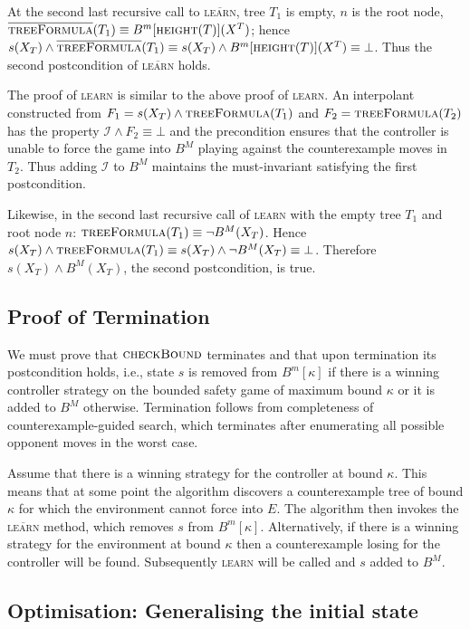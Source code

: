 \documentclass{llncs}
\newcommand{\II}{\mathcal{I}}
\newcommand{\textoverline}[1]{$\overline{\mbox{#1}}$}
\begin{document}
At the second last recursive call to \textsc{\textoverline{learn}}, tree $T_1$
is empty, $n$ is the root node, $\textsc{\textoverline{treeFormula}}(T_1)
\equiv B^m[\textsc{height}(T)](X^T)$; hence $s(X_T) \land
\textsc{\textoverline{treeFormula}}(T_1) \equiv s(X_T) \land
B^m[\textsc{height}(T)](X^T) \equiv \bot$.  Thus the second postcondition of
\textsc{\textoverline{learn}} holds.

The proof of \textsc{learn} is similar to the above proof of \textsc{learn}. An
interpolant constructed from $F_1=s(X_T) \land \textsc{treeFormula}(T_1)$
and $F_2 = \textsc{treeFormula}(T_2)$ has the property $\II \land F_2 \equiv
\bot$ and the precondition ensures that the controller is unable to force the
game into $B^M$ playing against the counterexample moves in $T_2$. Thus adding
$\II$ to $B^M$ maintains the must-invariant satisfying the first postcondition.

Likewise, in the second last recursive call of \textsc{learn} with the empty
tree $T_1$ and root node $n$: $\textsc{treeFormula}(T_1) \equiv \lnot
B^M(X_T)$.  Hence $s(X_T) \land \textsc{treeFormula}(T_1) \equiv
s(X_T) \land \lnot B^M(X_T) \equiv \bot$. Therefore $s(X_T) \land
B^M(X_T)$, the second postcondition, is true.

\subsection{Proof of Termination}

We must prove that $\textsc{checkBound}$ terminates and that upon termination
its postcondition holds, i.e., state $s$ is removed from $B^m[\kappa]$ if there
is a winning controller strategy on the bounded safety game of maximum bound
$\kappa$ or it is added to $B^M$ otherwise. Termination follows from
completeness of counterexample-guided search, which terminates after
enumerating all possible opponent moves in the worst case.

Assume that there is a winning strategy for the controller at bound $\kappa$.
This means that at some point the algorithm discovers a counterexample tree of
bound $\kappa$ for which the environment cannot force into $E$. The algorithm
then invokes the \textsc{\textoverline{learn}} method, which removes $s$ from
$B^m[\kappa]$.  Alternatively, if there is a winning strategy for the
environment at bound $\kappa$ then a counterexample losing for the controller
will be found.  Subsequently \textsc{learn} will be called and $s$ added to
$B^M$.

\subsection{Optimisation: Generalising the initial state}
\end{document}
